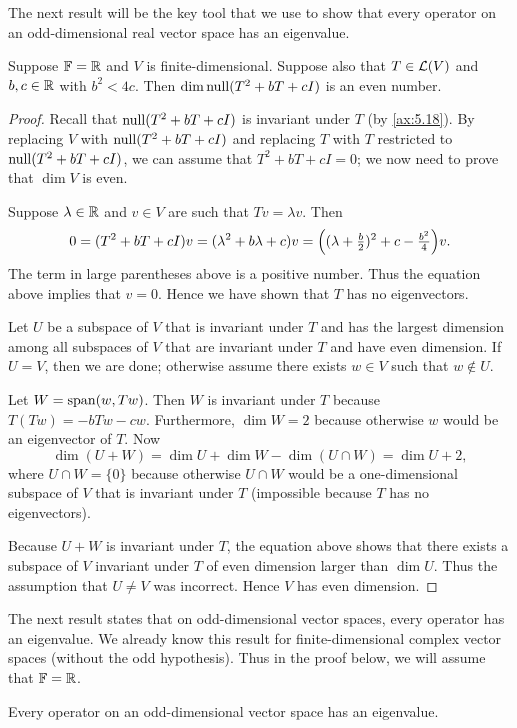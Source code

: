 The next result will be the key tool that we use to show that every operator
on an odd-dimensional real vector space has an eigenvalue.

\begin{result}\label{ax:5.33}
Suppose $\mathbb{F}=\mathbb{R}$ and $V$ is finite-dimensional. Suppose also that
$T\in\mathcal{L}(V)$ and $b,c\in\mathbb{R}$ with $b^2<4c$. Then $\operatorname{dim}\operatorname{null}(T^2+bT+cI)$ is an
even number.
\end{result}

\begin{proof}
Recall that $\operatorname{null}(T^2+bT+cI)$ is invariant under $T$ (by \ref{ax:5.18}). By
replacing $V$ with $\operatorname{null}(T^2+bT+cI)$ and replacing $T$ with $T$ restricted to
$\operatorname{null}(T^2+bT+cI)$, we can assume that $T^2+bT+cI=0$; we now need to prove
that $\dim V$ is even.

Suppose $\lambda\in\mathbb{R}$ and $v\in V$ are such that $Tv=\lambda v$. Then
\[ 0=(T^2+bT+cI)v=(\lambda^2+b\lambda+c)v
    =\Bigl((\lambda+\tfrac{b}{2})^2+c-\tfrac{b^2}{4}\Bigr)v. \]
The term in large parentheses above is a positive number. Thus the equation
above implies that $v=0$. Hence we have shown that $T$ has no eigenvectors.

Let $U$ be a subspace of $V$ that is invariant under $T$ and has the largest
dimension among all subspaces of $V$ that are invariant under $T$ and have
even dimension. If $U=V$, then we are done; otherwise assume there exists
$w\in V$ such that $w\notin U$.

Let $W=\operatorname{span}(w,Tw)$. Then $W$ is invariant under $T$ because
$T(Tw)=-bTw-cw$. Furthermore, $\dim W=2$ because otherwise $w$ would be an
eigenvector of $T$. Now
\[ \dim(U+W)=\dim U+\dim W-\dim(U\cap W)=\dim U+2, \]
where $U\cap W=\{0\}$ because otherwise $U\cap W$ would be a one-dimensional
subspace of $V$ that is invariant under $T$ (impossible because $T$ has no
eigenvectors).

Because $U+W$ is invariant under $T$, the equation above shows that there
exists a subspace of $V$ invariant under $T$ of even dimension larger than
$\dim U$. Thus the assumption that $U\ne V$ was incorrect. Hence $V$ has even
dimension.
\end{proof}

The next result states that on odd-dimensional vector spaces, every operator
has an eigenvalue. We already know this result for finite-dimensional complex
vector spaces (without the odd hypothesis). Thus in the proof below, we will
assume that $\mathbb{F}=\mathbb{R}$.

\begin{result}\label{ax:5.34}
Every operator on an odd-dimensional vector space has an eigenvalue.
\end{result}

